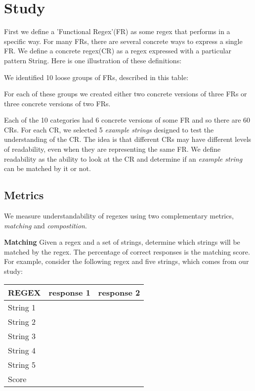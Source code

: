 
\section{Study}

First we define a 'Functional Regex'(FR) as some regex that performs in a specific way.  For many FRs, there are several concrete ways to express a single FR.
We define a concrete regex(CR) as a regex expressed with a particular pattern String.
Here is one illustration of these definitions:


We identified 10 loose groups of FRs, described in this table:


For each of these groups we created either two concrete versions of three FRs or three concrete versions of two FRs.

Each of the 10 categories had 6 concrete versions of some FR and so there are 60 CRs.  For each CR, we selected 5 \emph{example strings} designed to test the understanding of the CR.  The idea is that different CRs may have different levels of readability, even when they are representing the same FR.  We define readability as the ability to look at the CR and determine if an \emph{example string} can be matched by it or not.



\subsection{Metrics}
We measure understandability of regexes using two complementary metrics, \emph{matching} and \emph{compostition}.

\textbf{Matching}
Given a regex and a set of strings, determine which strings will be matched by the regex. The percentage of correct responses is the matching score. For example, consider the following regex and five strings, which comes from our study:

\begin{tabular} {l | l l}
REGEX & response 1 & response 2 \\ \hline
String 1\\
String 2\\
String 3\\
String 4\\
String 5  \\
Score \\
\end{tabular}

